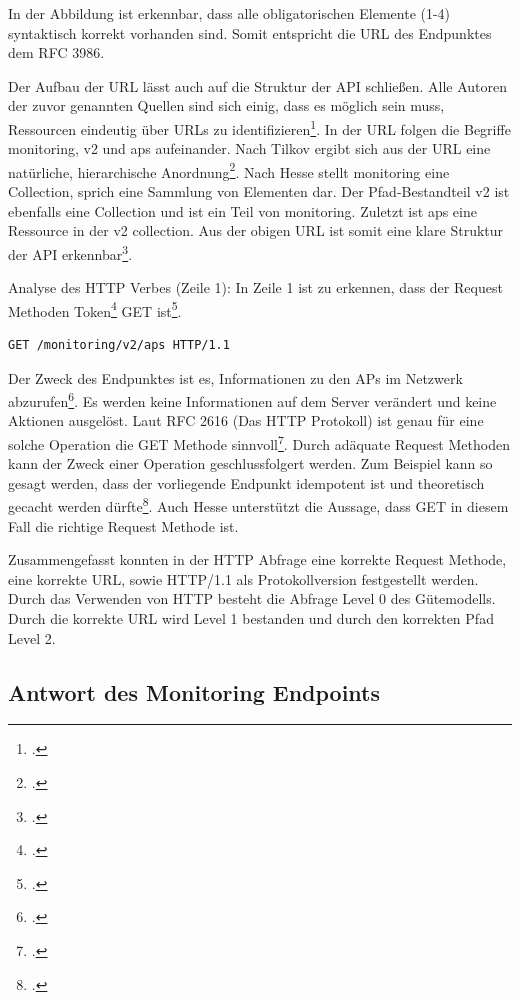 In der Abbildung ist erkennbar, dass alle obligatorischen Elemente (1-4) syntaktisch korrekt vorhanden sind. Somit entspricht die URL des Endpunktes dem RFC 3986.

Der Aufbau der URL lässt auch auf die Struktur der API schließen. Alle Autoren der zuvor genannten Quellen sind sich einig, dass es möglich sein muss, Ressourcen eindeutig über URLs zu identifizieren\footcite{fowler_richardson_2010}. In der URL folgen die Begriffe monitoring, v2 und aps aufeinander. Nach Tilkov ergibt sich aus der URL eine natürliche, hierarchische Anordnung\footcite[S. 40]{tilkov_rest_2015}. Nach Hesse stellt monitoring eine Collection, sprich eine Sammlung von Elementen dar. Der Pfad-Bestandteil v2 ist ebenfalls eine Collection und ist ein Teil von monitoring. Zuletzt ist aps eine Ressource in der v2 collection. Aus der obigen URL ist somit eine klare Struktur der API erkennbar\footcite[S. 12]{masse_rest_2012}. 

Analyse des HTTP Verbes (Zeile 1): In Zeile 1 ist zu erkennen, dass der Request Methoden Token\footcite[S. 36]{fielding_hypertext_1999} GET ist\footcite[S. 53]{fielding_hypertext_1999}. 

\begin{lstlisting}
GET /monitoring/v2/aps HTTP/1.1
\end{lstlisting}

Der Zweck des Endpunktes ist es, Informationen zu den APs im Netzwerk abzurufen\footcite{hewlett_packard_enterprise_development_lp_aruba_2021-1}. Es werden keine Informationen auf dem Server verändert und keine Aktionen ausgelöst. Laut RFC 2616 (Das HTTP Protokoll) ist genau für eine solche Operation die GET Methode sinnvoll\footcite[S. 53]{fielding_hypertext_1999}. Durch adäquate Request Methoden kann der Zweck einer Operation geschlussfolgert werden. Zum Beispiel kann so gesagt werden, dass der vorliegende Endpunkt idempotent ist und theoretisch gecacht werden dürfte\footcite[S. 24 und 26]{masse_rest_2012}. Auch Hesse unterstützt die Aussage, dass GET in diesem Fall die richtige Request Methode ist.

Zusammengefasst konnten in der HTTP Abfrage eine korrekte Request Methode, eine korrekte URL, sowie HTTP/1.1 als Protokollversion festgestellt werden. Durch das Verwenden von HTTP besteht die Abfrage Level 0 des Gütemodells. Durch die korrekte URL wird Level 1 bestanden und durch den korrekten Pfad Level 2.

\subsection{Antwort des Monitoring Endpoints}\label{subsection:antwort-des-monitoring-endpunktes}

